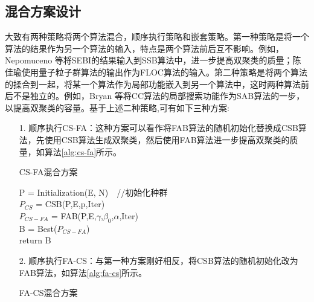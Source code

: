     \subsection{混合方案设计}\label{sec:three}
    大致有两种策略将两个算法混合，顺序执行策略和嵌套策略。第一种策略是将一个算法的结果作为另一个算法的输入，特点是两个算法前后互不影响。例如，Nepomuceno 等将SEBI的结果输入到SSB算法中，进一步提高双聚类的质量；陈佳瑜使用量子粒子群算法的输出作为FLOC算法的输入。第二种策略是将两个算法的揉合到一起，将某一个算法作为局部功能嵌入到另一个算法中，这时两种算法前后不是独立的。例如，Bryan 等将CC算法的局部搜索功能作为SAB算法的一步，以提高双聚类的容量。基于上述二种策略,可有如下三种方案:
    \begin{enumerate}
       \item[1.] 顺序执行CS-FA：这种方案可以看作将FAB算法的随机初始化替换成CSB算法，先使用CSB算法生成双聚类，然后使用FAB算法进一步提高双聚类的质量，如算法\ref{alg:cs-fa}所示。
        \begin{algorithm}[htbp]
        \caption{CS-FA混合方案} \label{alg:cs-fa}
        P = Initialization(E, N)　//初始化种群 \\
        $P_{CS}$ = CSB(P,E,p,Iter) \\
        $P_{CS-FA}$ = FAB(P,E,$\gamma$,$\beta_0$,$\alpha$,Iter) \\
        B = Best($P_{CS-FA}$) \\
        return B
        \end{algorithm}

       \item[2.] 顺序执行FA-CS：与第一种方案刚好相反，将CSB算法的随机初始化改为FAB算法，如算法\ref{alg:fa-cs}所示。
        \begin{algorithm}[htbp]
        \caption{FA-CS混合方案}\label{alg:fa-cs}


\end{algorithm}
\end{enumerate}
